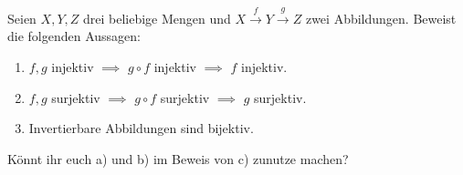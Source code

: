 \begin{aufg} \label{aufg:bijektiviso}
    Seien $X,Y,Z$ drei beliebige Mengen und $X \xrightarrow{f} Y \xrightarrow{g} Z$ zwei Abbildungen. Beweist die folgenden Aussagen:
    \begin{enumerate}
        \item $f,g$ injektiv $\implies$ $g\circ f$ injektiv $\implies$ $f$ injektiv.
        \item $f,g$ surjektiv $\implies$ $g\circ f$ surjektiv $\implies$ $g$ surjektiv.
        \item Invertierbare Abbildungen sind bijektiv.
    \end{enumerate}
    Könnt ihr euch a) und b) im Beweis von c) zunutze machen?
\end{aufg}

